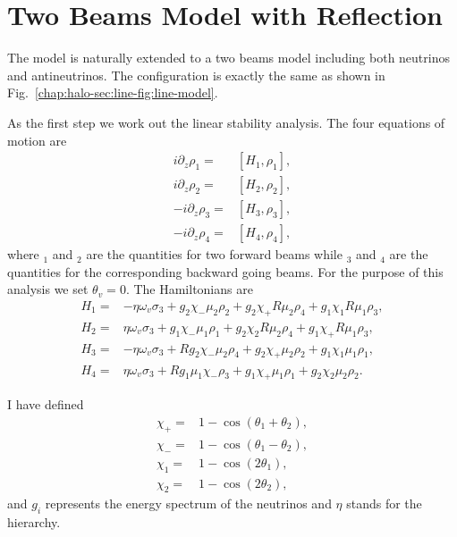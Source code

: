 \section{Two Beams Model with Reflection}

The model is naturally extended to a two beams model including both neutrinos and antineutrinos. The configuration is exactly the same as shown in Fig.~\ref{chap:halo-sec:line-fig:line-model}.

As the first step we work out the linear stability analysis. The four equations of motion are
\begin{align}
    i \partial_z \rho_1 = & [ H_1, \rho_1 ], \\
    i \partial_z \rho_2 = & [ H_2, \rho_2 ], \\
    -i \partial_z \rho_3 = & [ H_3, \rho_3 ], \\
    -i \partial_z \rho_4 = & [ H_4, \rho_4 ],
\end{align}
where ${}_1$ and ${}_2$ are the quantities for two forward beams while ${}_3$ and ${}_4$ are the quantities for the corresponding backward going beams. For the purpose of this analysis we set $\theta_v = 0$. The Hamiltonians are
\begin{align}
    H_1 =& -\eta \omega_v \sigma_3 + g_2 \chi_- \mu_2 \rho_2 + g_2 \chi_+ R \mu_2 \rho_4 + g_1 \chi_1 R \mu_1 \rho_3, \\
    H_2 =& \eta \omega_v \sigma_3 + g_1 \chi_- \mu_1 \rho_1 + g_2 \chi_2 R \mu_2 \rho_4 + g_1 \chi_+ R \mu_1 \rho_3, \\
    H_3 =& -\eta \omega_v \sigma_3 + R g_2 \chi_- \mu_2 \rho_4 + g_2 \chi_+\mu_2 \rho_2 + g_1 \chi_1 \mu_1 \rho_1, \\
    H_4 =& \eta \omega_v \sigma_3 + R g_1 \mu_1 \chi_- \rho_3 + g_1 \chi_+ \mu_1 \rho_1 + g_2 \chi_2 \mu_2 \rho_2.
\end{align}

I have defined 
\begin{align*}
    \chi_+ = & 1 - \cos ( \theta_1 + \theta_2 ), \\
    \chi_- = & 1 - \cos ( \theta_1 - \theta_2 ), \\
    \chi_1 = & 1 - \cos ( 2\theta_1 ), \\
    \chi_2 = & 1 - \cos ( 2\theta_2 ),
\end{align*}
and $g_i$ represents the energy spectrum of the neutrinos and $\eta$ stands for the hierarchy.


